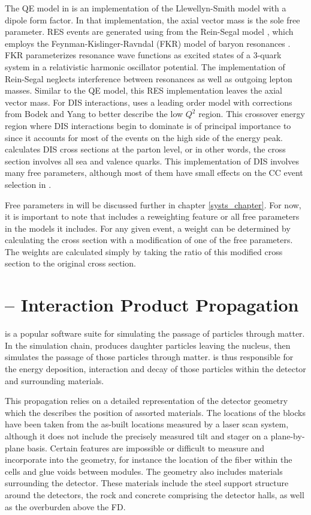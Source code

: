 The QE model in \genie is an implementation of the Llewellyn-Smith model \cite{LlewellynSmith} with a dipole form factor.  In that implementation, the axial vector mass is the sole free parameter.  RES events are generated using from the Rein-Segal model \cite{rein1981neutrino}, which employs the Feynman-Kislinger-Ravndal (FKR) model of baryon resonances \cite{feynman1971current}.  FKR parameterizes resonance
wave functions as excited states of a 3-quark system in a relativistic harmonic
oscillator potential.  The \genie implementation of Rein-Segal neglects interference between resonances as well as outgoing lepton masses.  Similar to the QE model, this RES implementation leaves the axial vector mass.  For DIS interactions, \genie uses a leading order model with corrections from Bodek and Yang \cite{bodek2003higher} to better describe the low $Q^2$ region.  This crossover energy region where DIS interactions begin to dominate is of principal importance to \nova since it accounts for most of the events on the high side of the energy peak.  \genie calculates DIS cross sections at the parton level, or in other words, the cross section involves all sea and valence quarks.  This implementation of DIS involves many free parameters, although most of them have small effects on the \numu CC event selection in \nova.

Free parameters in \genie will be discussed further in chapter \ref{systs_chapter}.  For now, it is important to note that \genie includes a reweighting feature or all free parameters in the models it includes.  For any given event, a weight can be determined by calculating the cross section with a modification of one of the free parameters.  The weights are calculated simply by taking the ratio of this modified cross section to the original cross section.


\section{\geant -- Interaction Product Propagation}
\label{geant_section}
\geant \cite{geant} is a popular software suite for simulating the passage of
particles through matter.  In the \nova simulation chain, \genie produces
daughter particles leaving the nucleus, then \geant simulates the passage of
those particles through matter.  \geant is thus responsible for the energy
deposition, interaction and decay of those particles within the detector and
surrounding materials.

This propagation relies on a detailed representation of the detector geometry which the describes the position of assorted materials.
The locations of the blocks have been taken from the as-built locations measured by a laser scan system, although it does not include the precisely measured tilt and stager on a plane-by-plane basis.
Certain features are impossible or difficult to measure and incorporate into
the geometry, for instance the location of the fiber within the cells and glue voids between modules.  The geometry also includes materials surrounding the detector.  These materials include the steel support structure around the detectors, the rock and concrete comprising the detector halls, as well as the overburden above the FD.

